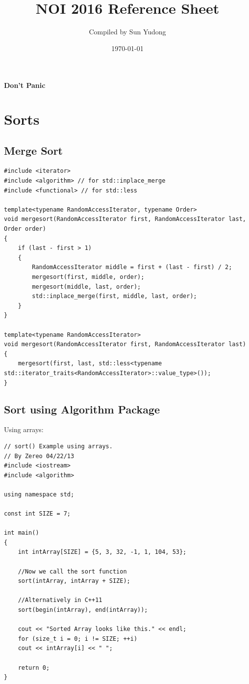 \documentclass[a4paper]{article}
\begin{document}
	
	\title{NOI 2016 Reference Sheet}
	\author{Compiled by Sun Yudong}
	\date{\today}
	\maketitle
	
	\begin{center}
		{\Huge \textbf{Don't Panic}}
	\end{center}
	
	\section{Sorts}
	\subsection{Merge Sort}
	\begin{lstlisting}
#include <iterator>
#include <algorithm> // for std::inplace_merge
#include <functional> // for std::less

template<typename RandomAccessIterator, typename Order>
void mergesort(RandomAccessIterator first, RandomAccessIterator last, Order order)
{
	if (last - first > 1)
	{
		RandomAccessIterator middle = first + (last - first) / 2;
		mergesort(first, middle, order);
		mergesort(middle, last, order);
		std::inplace_merge(first, middle, last, order);
	}
}

template<typename RandomAccessIterator>
void mergesort(RandomAccessIterator first, RandomAccessIterator last)
{
	mergesort(first, last, std::less<typename std::iterator_traits<RandomAccessIterator>::value_type>());
}
	\end{lstlisting}
	
	\subsection{Sort using Algorithm Package}
	Using arrays: 
	\begin{lstlisting}
// sort() Example using arrays.
// By Zereo 04/22/13
#include <iostream>
#include <algorithm>

using namespace std;

const int SIZE = 7;

int main()
{
	int intArray[SIZE] = {5, 3, 32, -1, 1, 104, 53};
	
	//Now we call the sort function
	sort(intArray, intArray + SIZE);
	
	//Alternatively in C++11
	sort(begin(intArray), end(intArray));
	
	cout << "Sorted Array looks like this." << endl;
	for (size_t i = 0; i != SIZE; ++i)
	cout << intArray[i] << " ";
	
	return 0;
}
	\end{lstlisting}
	
\end{document}
